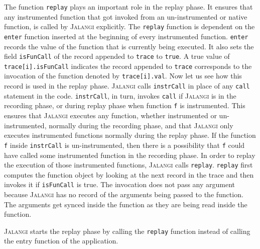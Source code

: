 \documentclass{sig-alternate}
\def\jalangi{\textsc{Jalangi}}
\newcommand \dsl [1] {\ensuremath{{\tt #1}}\xspace}
\newcommand \Sync{\dsl{sync}}
\begin{document}
The function \texttt{replay} plays an important role in the replay
phase.  It ensures that any instrumented function that got invoked
from an un-instrumented or native function, is called by \jalangi{}
explicitly.  The \texttt{replay} function is dependent on the
\texttt{enter} function inserted at the beginning of every
instrumented function.  \texttt{enter} records the value of the
function that is currently being executed.  It also sets the field
\texttt{isFunCall} of the record appended to \texttt{trace} to
\texttt{true}.  A true value of \texttt{trace[i].isFunCall} indicates
the record appended to \texttt{trace} corresponds to the invocation of
the function denoted by \texttt{trace[i].val}.  Now let us see how
this record is used in the replay phase.  \jalangi{} calls
\texttt{instrCall} in place of any \texttt{call} statement in the
code.  \texttt{instrCall}, in turn, invokes \texttt{call} if
\jalangi{} is in the recording phase, or during replay phase when
function \texttt{f} is instrumented.  This ensures that \jalangi{}
executes any function, whether instrumented or un-instrumented,
normally during the recording phase, and that \jalangi{} only executes
instrumented functions normally during the replay phase. If the
function \texttt{f} inside \texttt{instrCall} is un-instrumented, then
there is a possibility that \texttt{f} could have called some
instrumented function in the recording phase.  In order to replay the
execution of those instrumented functions, \jalangi{} calls
\texttt{replay}.  \texttt{replay} first computes the function object
by looking at the next record in the trace and then invokes it if
\texttt{isFunCall} is true.  The invocation does not pass any argument
because \jalangi{} has no record of the arguments being passed to the
function.  The arguments get synced inside the function as they are
being read inside the function.

\jalangi{} starts the replay phase by calling the \texttt{replay}
function instead of calling the entry function of the application.

 

\end{document}
